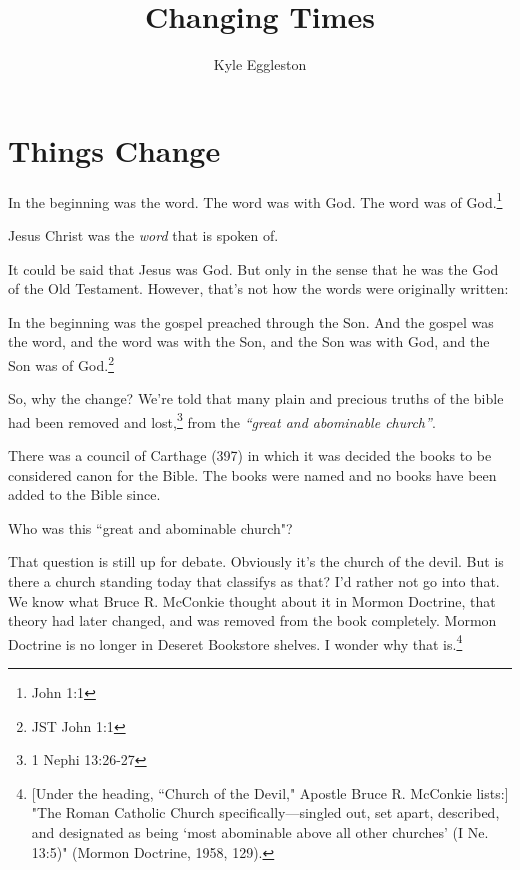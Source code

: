 \documentclass{article}
\title{Changing Times}
\author{Kyle Eggleston}
\begin{document}
\maketitle
\newpage

\tableofcontents
\thispagestyle{empty}
\newpage


\section{Things Change}

\begin{displayquote}
In the beginning was the word. The word was with God. The word was of 
God.\footnote{John 1:1} 
\end{displayquote}

Jesus Christ was the \textit{word} that is spoken of.

It could be said that Jesus was God. But only in the sense that he was the 
God of the Old Testament.\cite{otStudentManual} However, that's not how the
words were originally written:

\begin{displayquote}
In the beginning was the gospel preached through the Son. And the gospel was 
the word, and the word was with the Son, and the Son was with God, and the Son 
was of God.\footnote{JST John 1:1}
\end{displayquote}

So, why the change? We're told that many plain and precious truths of the bible 
had been removed and lost,\footnote{1 Nephi 13:26-27} from the \textit{``great 
and abominable church''}.

There was a council of Carthage (397) in which it was decided the books to
be considered canon for the Bible. The books were named and no books have
been added to the Bible since.

Who was this ``great and abominable church"?

That question is still up for debate. Obviously it's the church of the devil. 
But is there a church standing today that classifys as that? I'd rather not 
go into that. We know what Bruce R. McConkie thought about it in Mormon 
Doctrine, that theory had later changed, and was removed from the book 
completely. Mormon Doctrine is no longer in Deseret Bookstore shelves. I wonder 
why that is.\footnote{[Under the heading, ``Church of the Devil," Apostle Bruce 
R. McConkie lists:] "The Roman Catholic Church specifically—singled out, set 
apart, described, and designated as being ‘most abominable above all other 
churches’ (I Ne. 13:5)" (Mormon Doctrine, 1958, 129).}
\end{document}
